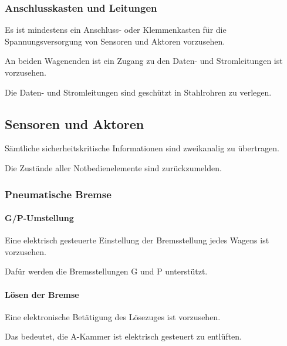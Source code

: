 \subsubsection{Anschlusskasten und Leitungen}
\begin{feat}
Es ist mindestens ein Anschluss- oder Klemmenkasten für die Spannungsversorgung von Sensoren und Aktoren vorzusehen. 
\end{feat}
\begin{feat}
An beiden Wagenenden ist ein Zugang zu den Daten- und Stromleitungen ist vorzusehen.
\end{feat}
\begin{feat}
Die Daten- und Stromleitungen sind geschützt in Stahlrohren zu verlegen.
\end{feat}

\subsection{Sensoren und Aktoren}
\begin{feat}
Sämtliche sicherheitskritische Informationen sind zweikanalig zu übertragen.
\end{feat}
\begin{feat}
Die Zustände aller Notbedienelemente sind zurückzumelden.
\end{feat}

\subsubsection{Pneumatische Bremse}
\paragraph{G/P-Umstellung}
\begin{feat}
Eine elektrisch gesteuerte Einstellung der Bremsstellung jedes Wagens ist vorzusehen.
\end{feat}
\begin{rem} [zu Anf. 19]
Dafür werden die Bremsstellungen G und P unterstützt.
\end{rem}

\paragraph{Lösen der Bremse}
\begin{feat}
Eine elektronische Betätigung des Lösezuges ist vorzusehen.
\end{feat}
\begin{rem}[zu Anf. 20]
Das bedeutet, die A-Kammer ist elektrisch gesteuert zu entlüften.
\end{rem}


